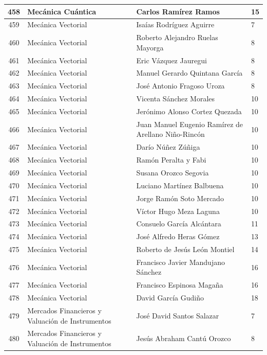 {\begin{longtable}{|c|p{6.5cm}|p{5cm}|p{1.5cm}|}
  458 & Mecánica Cuántica & Carlos Ramírez Ramos & 15 \\ \hline
  459 & Mecánica Vectorial & Isaías Rodríguez Aguirre & 7 \\ \hline
  460 & Mecánica Vectorial & Roberto Alejandro Ruelas Mayorga & 8 \\ \hline
  461 & Mecánica Vectorial & Eric Vázquez Jauregui & 8 \\ \hline
  462 & Mecánica Vectorial & Manuel Gerardo Quintana García & 8 \\ \hline
  463 & Mecánica Vectorial & José Antonio Fragoso Uroza & 8 \\ \hline
  464 & Mecánica Vectorial & Vicenta Sánchez Morales & 10 \\ \hline
  465 & Mecánica Vectorial & Jerónimo Alonso Cortez Quezada & 10 \\ \hline
  466 & Mecánica Vectorial & Juan Manuel Eugenio Ramírez de Arellano Niño-Rincón & 10 \\ \hline
  467 & Mecánica Vectorial & Darío Núñez Zúñiga & 10 \\ \hline
  468 & Mecánica Vectorial & Ramón Peralta y Fabi & 10 \\ \hline
  469 & Mecánica Vectorial & Susana Orozco Segovia & 10 \\ \hline
  470 & Mecánica Vectorial & Luciano Martínez Balbuena & 10 \\ \hline
  471 & Mecánica Vectorial & Jorge Ramón Soto Mercado & 10 \\ \hline
  472 & Mecánica Vectorial & Víctor Hugo Meza Laguna & 10 \\ \hline
  473 & Mecánica Vectorial & Consuelo García Alcántara & 11 \\ \hline
  474 & Mecánica Vectorial & José Alfredo Heras Gómez & 13 \\ \hline
  475 & Mecánica Vectorial & Roberto de Jesús León Montiel & 14 \\ \hline
  476 & Mecánica Vectorial & Francisco Javier Mandujano Sánchez & 16 \\ \hline
  477 & Mecánica Vectorial & Francisco Espinosa Magaña & 16 \\ \hline
  478 & Mecánica Vectorial & David García Gudiño & 18 \\ \hline
  479 & Mercados Financieros y Valuación de Instrumentos & José David Santos Salazar & 7 \\ \hline
  480 & Mercados Financieros y Valuación de Instrumentos & Jesús Abraham Cantú Orozco & 8 \\ \hline

\end{longtable}}
